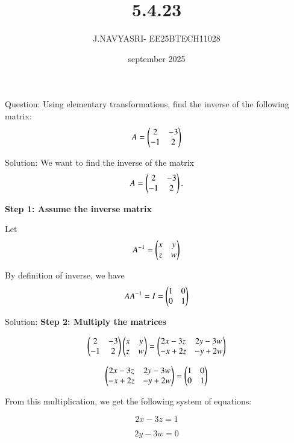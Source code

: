 \documentclass{beamer}
\title %
{5.4.23}
\date{september 2025}
\author %
{J.NAVYASRI- EE25BTECH11028}
\begin{document}
\frame{\titlepage}
\begin{frame}{Question:}
Using elementary transformations, find the inverse of the following matrix:
\[
A = \begin{pmatrix}2 & -3 \\ -1 & 2\end{pmatrix}
\]

\end{frame}
\begin{frame}{Solution:}
We want to find the inverse of the matrix
\[
A = \begin{pmatrix}2 & -3 \\ -1 & 2\end{pmatrix}.
\]

\textbf{Step 1: Assume the inverse matrix}

Let
\begin{equation}
A^{-1} = \begin{pmatrix}x & y \\ z & w\end{pmatrix}
\end{equation}

By definition of inverse, we have
\begin{equation}
A A^{-1} = I = \begin{pmatrix}1 & 0 \\ 0 & 1\end{pmatrix}
\end{equation}
\end{frame}
\begin{frame}{Solution:}
\textbf{Step 2: Multiply the matrices}

\begin{equation}
\begin{pmatrix}2 & -3 \\ -1 & 2\end{pmatrix} \begin{pmatrix}x & y \\ z & w\end{pmatrix} =
\begin{pmatrix}2x - 3z & 2y - 3w \\ -x + 2z & -y + 2w\end{pmatrix}
\end{equation}

\begin{equation}
\begin{pmatrix}2x - 3z & 2y - 3w \\ -x + 2z & -y + 2w\end{pmatrix} = 
\begin{pmatrix}1 & 0 \\ 0 & 1\end{pmatrix}
\end{equation}

From this multiplication, we get the following system of equations:

\begin{equation}
2x - 3z = 1
\end{equation}

\begin{equation}
2y - 3w = 0
\end{equation}
\end{frame}
\end{document}

